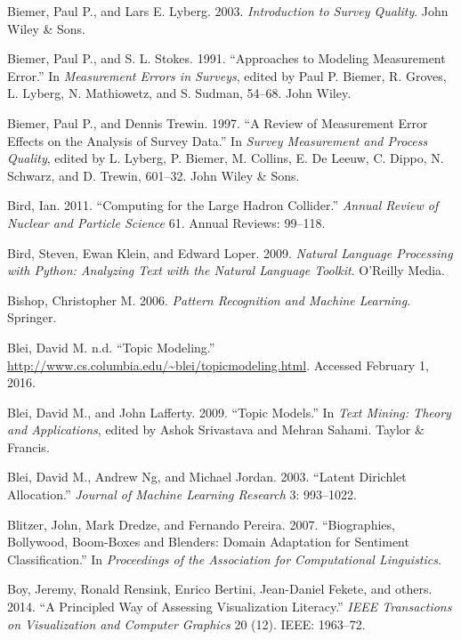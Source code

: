 \documentclass[]{krantz}
\begin{document}
\hypertarget{ref-biemer2003}{}
Biemer, Paul P., and Lars E. Lyberg. 2003. \emph{Introduction to Survey
Quality}. John Wiley \& Sons.

\hypertarget{ref-BiemerStokes1991}{}
Biemer, Paul P., and S. L. Stokes. 1991. ``Approaches to Modeling
Measurement Error.'' In \emph{Measurement Errors in Surveys}, edited by
Paul P. Biemer, R. Groves, L. Lyberg, N. Mathiowetz, and S. Sudman,
54--68. John Wiley.

\hypertarget{ref-biemer1997review}{}
Biemer, Paul P., and Dennis Trewin. 1997. ``A Review of Measurement
Error Effects on the Analysis of Survey Data.'' In \emph{Survey
Measurement and Process Quality}, edited by L. Lyberg, P. Biemer, M.
Collins, E. De Leeuw, C. Dippo, N. Schwarz, and D. Trewin, 601--32. John
Wiley \& Sons.

\hypertarget{ref-bird2011computing}{}
Bird, Ian. 2011. ``Computing for the Large Hadron Collider.''
\emph{Annual Review of Nuclear and Particle Science} 61. Annual Reviews:
99--118.

\hypertarget{ref-bird-09}{}
Bird, Steven, Ewan Klein, and Edward Loper. 2009. \emph{Natural Language
Processing with Python: Analyzing Text with the Natural Language
Toolkit}. O'Reilly Media.

\hypertarget{ref-bishop-06}{}
Bishop, Christopher M. 2006. \emph{Pattern Recognition and Machine
Learning}. Springer.

\hypertarget{ref-BleiTM}{}
Blei, David M. n.d. ``Topic Modeling.''
\url{http://www.cs.columbia.edu/~blei/topicmodeling.html}. Accessed
February 1, 2016.

\hypertarget{ref-blei-09}{}
Blei, David M., and John Lafferty. 2009. ``Topic Models.'' In \emph{Text
Mining: Theory and Applications}, edited by Ashok Srivastava and Mehran
Sahami. Taylor \& Francis.

\hypertarget{ref-blei-03}{}
Blei, David M., Andrew Ng, and Michael Jordan. 2003. ``Latent Dirichlet
Allocation.'' \emph{Journal of Machine Learning Research} 3: 993--1022.

\hypertarget{ref-blitzer-07}{}
Blitzer, John, Mark Dredze, and Fernando Pereira. 2007. ``Biographies,
Bollywood, Boom-Boxes and Blenders: Domain Adaptation for Sentiment
Classification.'' In \emph{Proceedings of the Association for
Computational Linguistics}.

\hypertarget{ref-boy2014principled}{}
Boy, Jeremy, Ronald Rensink, Enrico Bertini, Jean-Daniel Fekete, and
others. 2014. ``A Principled Way of Assessing Visualization Literacy.''
\emph{IEEE Transactions on Visualization and Computer Graphics} 20 (12).
IEEE: 1963--72.
\end{document}
